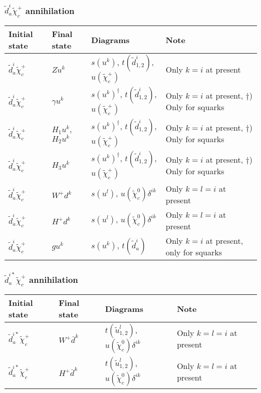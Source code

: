 \subsubsection{$\tilde{d}^{i}_{a} \tilde{\chi}_{c}^{+}$ annihilation}

\begin{center}
\begin{tabular}{llll} \hline
{\bfseries Initial state} & {\bfseries Final state} &
{\bfseries Diagrams} & {\bfseries Note} \\ \hline \tabspace
$\tilde{d}^{i}_a \tilde{\chi}_{c}^+$ & $Z u^k$ &
$s(u^k)$, $t(\tilde{d}^i_{1,2})$, $u(\tilde{\chi}_c^+)$
& Only $k=i$ at present \\
$\tilde{d}^{i}_a \tilde{\chi}_{c}^+$ & $\gamma u^k$ &
$s(u^k)^\dagger$, $t(\tilde{d}^i_{1,2})$, $u(\tilde{\chi}_c^+)$ 
& Only $k=i$ at present, $\dagger$) Only for squarks \\
$\tilde{d}^{i}_a \tilde{\chi}_{c}^+$ & $H_1 u^k$, $H_2 u^k$ &
$s(u^k)^\dagger$, $t(\tilde{d}^i_{1,2})$, $u(\tilde{\chi}_c^+)$ 
& Only $k=i$ at present, $\dagger$) Only for squarks \\
$\tilde{d}^{i}_a \tilde{\chi}_{c}^+$ & $H_3 u^k$ &
$s(u^k)^\dagger$, $t(\tilde{d}^i_{1,2})$, $u(\tilde{\chi}_c^+)$ 
& Only $k=i$ at present, $\dagger$) Only for squarks \\
$\tilde{d}^{i}_a \tilde{\chi}_{c}^+$ & $W^+ d^k$ &
$s(u^l)$, $u(\tilde{\chi}_c^0)\delta^{ik}$
& Only $k=l=i$ at present \\
$\tilde{d}^{i}_a \tilde{\chi}_{c}^+$ & $H^+ d^k$ &
$s(u^l)$, $u(\tilde{\chi}_c^0)\delta^{ik}$
& Only $k=l=i$ at present \\
$\tilde{d}^{i}_a \tilde{\chi}_{c}^+$ & $g u^k$ &
$s(u^k)$, $t(\tilde{d}_a^i)$
& Only $k=i$ at present, only for squarks \\ \hline
\end{tabular}
\end{center}

\subsubsection{$\tilde{d}^{i*}_{a} \tilde{\chi}_{c}^{+}$ annihilation}

\begin{center}
\begin{tabular}{llll} \hline
{\bfseries Initial state} & {\bfseries Final state} &
{\bfseries Diagrams} & {\bfseries Note} \\ \hline \tabspace
$\tilde{d}^{i*}_a \tilde{\chi}_{c}^+$ & $W^+ \bar{d}^k$ &
$t(\tilde{u}^l_{1,2})$, $u(\tilde{\chi}_c^0)\delta^{ik}$ 
& Only $k=l=i$ at present \\
$\tilde{d}^{i*}_a \tilde{\chi}_{c}^+$ & $H^+ \bar{d}^k$ &
$t(\tilde{u}^l_{1,2})$, $u(\tilde{\chi}_c^0)\delta^{ik}$
& Only $k=l=i$ at present \\ \hline
\end{tabular}
\end{center}

